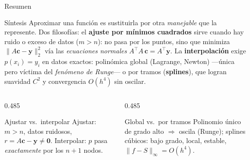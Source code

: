 \documentclass[aspectratio=169,10pt]{beamer}
\begin{document}
\begin{frame}{Resumen}
\begin{cardidea}{Síntesis}{\faLightbulb}
Aproximar una función es sustituirla por otra \emph{manejable} que la represente. Dos filosofías: el \textbf{ajuste por mínimos cuadrados} sirve cuando hay ruido o exceso de datos ($m>n$): no pasa por los puntos, sino que minimiza $\|A\mathbf c-\mathbf y\|_2^2$ vía las \emph{ecuaciones normales} $A^{\!\top}\!A\,\mathbf c=A^{\!\top}\mathbf y$. La \textbf{interpolación} exige $p(x_i)=y_i$ en datos exactos: polinómica global (Lagrange, Newton) —única pero víctima del \emph{fenómeno de Runge}— o por tramos (\textbf{splines}), que logran suavidad $C^2$ y convergencia $O(h^4)$ sin oscilar.
\end{cardidea}
\vspace{2mm}
\begin{columns}[T]
\begin{column}{0.485\textwidth}
\begin{cardgear}{Ajustar vs.\ interpolar}{\faCogs}
Ajustar: $m>n$, datos ruidosos, $r=A\mathbf c-\mathbf y\neq\mathbf 0$. Interpolar: $p$ pasa \emph{exactamente} por los $n{+}1$ nodos.
\end{cardgear}
\end{column}
\begin{column}{0.485\textwidth}
\begin{cardgear}{Global vs.\ por tramos}{\faCogs}
Polinomio único de grado alto $\Rightarrow$ oscila (Runge); splines cúbicos: bajo grado, local, estable, $\|f-S\|_\infty=O(h^4)$.
\end{cardgear}
\end{column}
\end{columns}
\end{frame}
\end{document}
